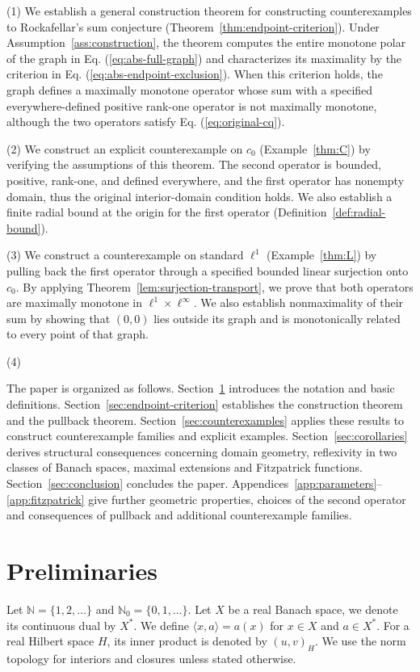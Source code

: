 \documentclass[11pt]{article}
\newcommand{\N}{\mathbb N}
\newcommand{\pair}[2]{\langle #1,#2\rangle}
\theoremstyle{definition}
\theoremstyle{remark}
\begin{document}
(1) We establish a general construction theorem for constructing counterexamples to Rockafellar's sum conjecture (Theorem~\ref{thm:endpoint-criterion}). Under Assumption~\ref{ass:construction}, the theorem computes the entire monotone polar of the graph in Eq. (\ref{eq:abs-full-graph}) and characterizes its maximality by the criterion in Eq. (\ref{eq:abs-endpoint-exclusion}). When this criterion holds, the graph defines a maximally monotone operator whose sum with a specified everywhere-defined positive rank-one operator is not maximally monotone, although the two operators satisfy Eq. (\ref{eq:original-cq}).

(2) We construct an explicit counterexample on $c_0$ (Example~\ref{thm:C}) by verifying the assumptions of this theorem. The second operator is bounded, positive, rank-one, and defined everywhere, and the first operator has nonempty domain, thus the original interior-domain condition holds. We also establish a finite radial bound at the origin for the first operator (Definition~\ref{def:radial-bound}). 

(3) We construct a counterexample on standard $\ell^1$ (Example~\ref{thm:L}) by pulling back the first operator through a specified bounded linear surjection onto $c_0$. By applying Theorem~\ref{lem:surjection-transport}, we prove that both operators are maximally monotone in $\ell^1\times\ell^\infty$. We also establish nonmaximality of their sum by showing that $(0,0)$ lies outside its graph and is monotonically related to every point of that graph.

(4) 

The paper is organized as follows. Section~\ref{sec:definitions} introduces the notation and basic definitions. Section~\ref{sec:endpoint-criterion} establishes the construction theorem and the pullback theorem. Section~\ref{sec:counterexamples} applies these results to construct counterexample families and explicit examples. Section~\ref{sec:corollaries} derives structural consequences concerning domain geometry, reflexivity in two classes of Banach spaces, maximal extensions and Fitzpatrick functions. Section~\ref{sec:conclusion} concludes the paper. Appendices~\ref{app:parameters}--\ref{app:fitzpatrick} give further geometric properties, choices of the second operator and consequences of pullback and additional counterexample families.  


\section{Preliminaries}
\label{sec:definitions}
Let $\N=\{1,2,\ldots\}$ and $\N_0=\{0,1,\ldots\}$. Let $X$ be a real Banach space, we denote its continuous dual by $X^*$. We define $\pair{x}{a}=a(x)$ for $x\in X$ and $a\in X^*$. For a real Hilbert space $H$, its inner product is denoted by $(u,v)_H$. We use the norm topology for interiors and closures unless stated otherwise. 
\end{document}
